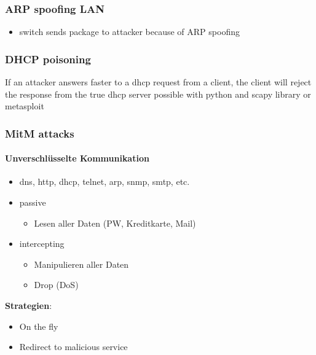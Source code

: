 \subsubsection{ARP spoofing LAN}
\begin{itemize}
    \item switch sends package to attacker because of ARP spoofing
\end{itemize}

\subsubsection{DHCP poisoning}
If an attacker answers faster to a dhcp request from a client, the client will reject the response from the true dhcp server possible with python and scapy library or metasploit


\subsubsection{MitM attacks}
\paragraph{Unverschlüsselte Kommunikation}
\begin{itemize}
    \item dns, http, dhcp, telnet, arp, snmp, smtp, etc.
    \item passive
    \begin{itemize}
        \item Lesen aller Daten (PW, Kreditkarte, Mail)
    \end{itemize}
    \item intercepting
    \begin{itemize}
        \item Manipulieren aller Daten
        \item Drop (DoS)\\
    \end{itemize}
\end{itemize}

\textbf{Strategien}:
\begin{itemize}
    \item On the fly
    \item Redirect to malicious service
\end{itemize}

